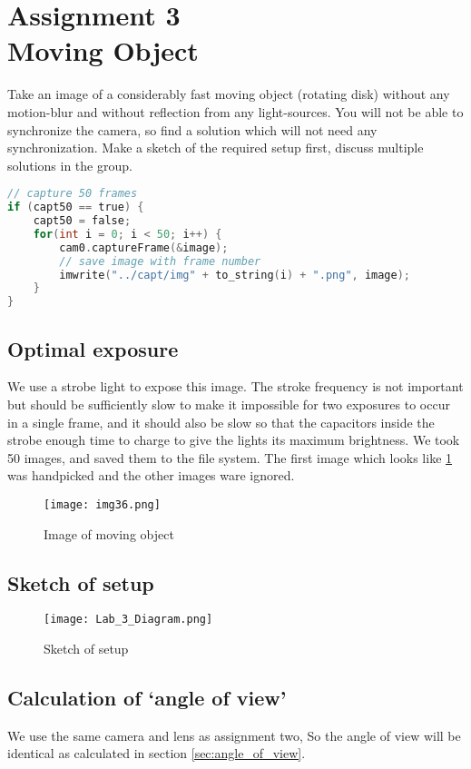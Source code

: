\section {Assignment 3 \\ {Moving Object}}
\label {sec:assignment_3}

Take an image of a considerably fast moving object (rotating disk) without any motion-blur and without reflection from any light-sources. You will not be able to synchronize the camera, so find a solution which will not need any synchronization.
Make a sketch of the required setup first, discuss multiple solutions in the group. \cite{Lab_Assignments}



\begin{lstlisting}[language=C, caption=save image to file, label=lst:50loop]
// capture 50 frames
if (capt50 == true) {
    capt50 = false;
    for(int i = 0; i < 50; i++) {
        cam0.captureFrame(&image);
        // save image with frame number
        imwrite("../capt/img" + to_string(i) + ".png", image);
    }
}
\end{lstlisting}


\subsection{Optimal exposure}

We use a strobe light to expose this image. The stroke frequency is not important but should be sufficiently slow to make it impossible for two exposures to occur in a single frame, and it should also be slow so that the capacitors inside the strobe enough time to charge to give the lights its maximum brightness. We took 50 images, and saved them to the file system. The first image which looks like \ref{fig:img36} was handpicked and the other images ware ignored.

\begin{figure}[h!]
    \centering
    \texttt{[image: img36.png]}
    \caption{Image of moving object}
    \label{fig:img36}
\end{figure}

\subsection{Sketch of setup}

\begin{figure}[h!]
    \centering
    \texttt{[image: Lab\_3\_Diagram.png]}
    \caption{Sketch of setup}
    \label{fig:Lab_3_Diagram}
\end{figure}

\subsection{Calculation of ‘angle of view’}

We use the same camera and lens as assignment two, So the angle of view will be identical as calculated in section \ref{sec:angle_of_view}.